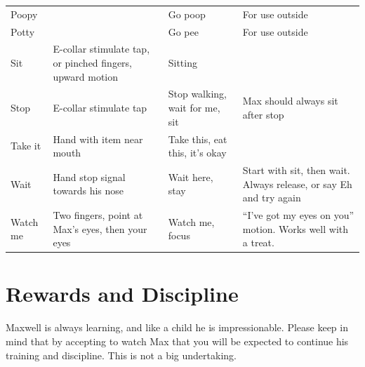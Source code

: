 \documentclass[pdftex,12pt]{article}
\begin{document}
\begin{table}[H]
\begin{adjustwidth}{-4.5cm}{-4.5cm}
\begin{center}
\begin{tabular}{lp{}p{}p{}}
\rowcolor{gray!25} Poopy      &                                                                  & Go poop                                               & For use outside                                                      \\
\rowcolor{white}   Potty      &                                                                  & Go pee                                                & For use outside                                                      \\
\rowcolor{gray!25} Sit        & E-collar stimulate tap, or pinched fingers, upward \break motion & Sitting                                               &                                                                      \\
\rowcolor{white}   Stop       & E-collar stimulate tap                                           & Stop walking, wait for me, sit                        & Max should always sit after stop                                     \\
\rowcolor{gray!25} Take it    & Hand with item near mouth                                        & Take this, eat this, it's okay                        &                                                                      \\
\rowcolor{white}   Wait       & Hand stop signal towards his nose                                & Wait here, stay                                       & Start with sit, then wait. Always release, or say Eh and try again   \\
\rowcolor{gray!25} Watch me   & Two fingers, point at Max's eyes, then your eyes                 & Watch me, focus                                       & ``I've got my eyes on you'' motion. Works well with a treat.         \\
\end{tabular}
\egroup
\end{center}
\end{adjustwidth}
\end{table}

\newpage
\section{Rewards and Discipline}

Maxwell is always learning, and like a child he is impressionable.
Please keep in mind that by accepting to watch Max that you will be expected to continue his training and discipline.
This is not a big undertaking.
\end{document}
